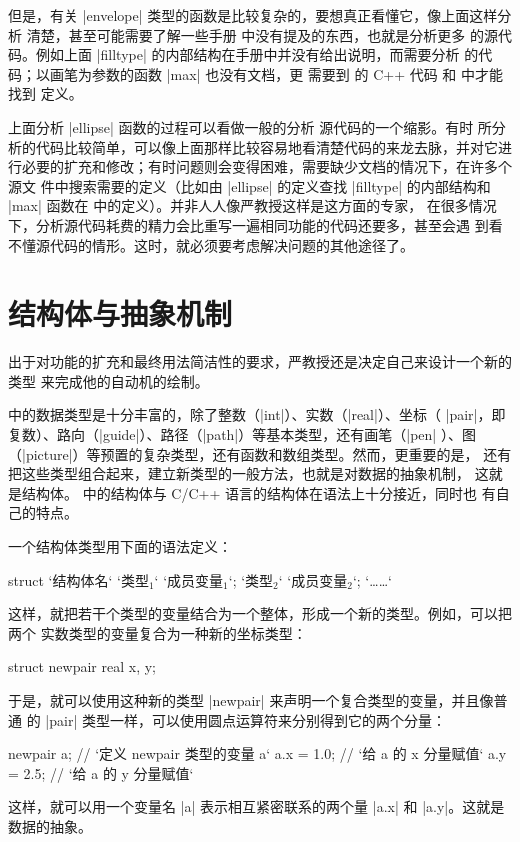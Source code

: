 但是，有关 |envelope| 类型的函数是比较复杂的，要想真正看懂它，像上面这样分析
清楚，甚至可能需要了解一些手册 \cite{asyman} 中没有提及的东西，也就是分析更多
的源代码。例如上面 |filltype| 的内部结构在手册中并没有给出说明，而需要分析
 的代码；以画笔为参数的函数 |max| 也没有文档，更
需要到 \Asy{} 的 C++ 代码  和  中才能找到
定义。

上面分析 |ellipse| 函数的过程可以看做一般的分析 \Asy{} 源代码的一个缩影。有时
所分析的代码比较简单，可以像上面那样比较容易地看清楚代码的来龙去脉，并对它进
行必要的扩充和修改；有时问题则会变得困难，需要缺少文档的情况下，在许多个源文
件中搜索需要的定义（比如由 |ellipse| 的定义查找 |filltype| 的内部结构和 |max|
函数在  中的定义）。并非人人像严教授这样是这方面的专家，
在很多情况下，分析源代码耗费的精力会比重写一遍相同功能的代码还要多，甚至会遇
到看不懂源代码的情形。这时，就必须要考虑解决问题的其他途径了。

\section{结构体与抽象机制}
\label{sec:struct}

出于对功能的扩充和最终用法简洁性的要求，严教授还是决定自己来设计一个新的类型
来完成他的自动机的绘制。

\Asy{} 中的数据类型是十分丰富的，除了整数（|int|）、实数（|real|）、坐标（
|pair|，即复数）、路向（|guide|）、路径（|path|）等基本类型，还有画笔（|pen|
）、图（|picture|）等预置的复杂类型，还有函数和数组类型。然而，更重要的是，
\Asy{} 还有把这些类型组合起来，建立新类型的一般方法，也就是对数据的抽象机制，
这就是结构体。\Asy{} 中的结构体与 C/C++ 语言的结构体在语法上十分接近，同时也
有自己的特点。

一个结构体类型用下面的语法定义：
\begin{asycode}
struct `结构体名` {
    `类型$_1$` `成员变量$_1$`;
    `类型$_2$` `成员变量$_2$`;
    `……`
}
\end{asycode}
这样，就把若干个类型的变量结合为一个整体，形成一个新的类型。例如，可以把两个
实数类型的变量复合为一种新的坐标类型：
\begin{asycode}
struct newpair {
    real x, y;
}
\end{asycode}
于是，就可以使用这种新的类型 |newpair| 来声明一个复合类型的变量，并且像普通
的 |pair| 类型一样，可以使用圆点运算符来分别得到它的两个分量：
\begin{asycode}
newpair a;     // `\color{comment}定义 newpair 类型的变量 a`
a.x = 1.0;      // `\color{comment}给 a 的 x 分量赋值`
a.y = 2.5;      // `\color{comment}给 a 的 y 分量赋值`
\end{asycode}
这样，就可以用一个变量名 |a| 表示相互紧密联系的两个量 |a.x| 和 |a.y|。这就是
数据的抽象。

